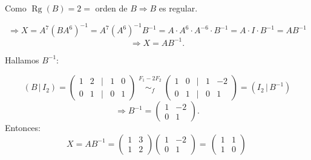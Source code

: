 \documentclass[a4paper,12pt]{article}
\begin{document}
\begin{ejercicio}[title=Ejercicio 18]
\vspace{0.5em}

Como \(\operatorname{Rg}(B)=2=\) orden de \(B\Rightarrow B\) es regular.

\vspace{0.5em}

\[
\Rightarrow X = A^7 (BA^6)^{-1} = A^7 (A^6)^{-1} B^{-1} = A\cdot A^6 \cdot A^{-6} \cdot B^{-1} = A \cdot I \cdot B^{-1} = AB^{-1}
\]
\[
\Rightarrow X = AB^{-1}.
\]

Hallamos \(B^{-1}\):

\[
(B \,|\, I_2) =
\begin{pmatrix}
1 & 2 &\Big|& 1 & 0\\
0 & 1 &\Big|& 0 & 1
\end{pmatrix}
\overset{\substack{F_1 - 2F_2 \\ {}}}{\sim_f}
\begin{pmatrix}
1 & 0 &\Big|& 1 & -2\\
0 & 1 &\Big|& 0 & 1
\end{pmatrix}
= (I_2 \,|\, B^{-1})
\]
\[
\Rightarrow B^{-1} =
\begin{pmatrix}
1 & -2\\
0 & 1
\end{pmatrix}.
\]
Entonces:
\[
X = AB^{-1} = 
\begin{pmatrix}
1 & 3\\
1 & 2
\end{pmatrix}
\begin{pmatrix}
1 & -2\\
0 & 1
\end{pmatrix}
=
\boxed{\,\begin{pmatrix}1 & 1\\[4pt]1 & 0\end{pmatrix}\,}
\]
\end{ejercicio}
\end{document}
